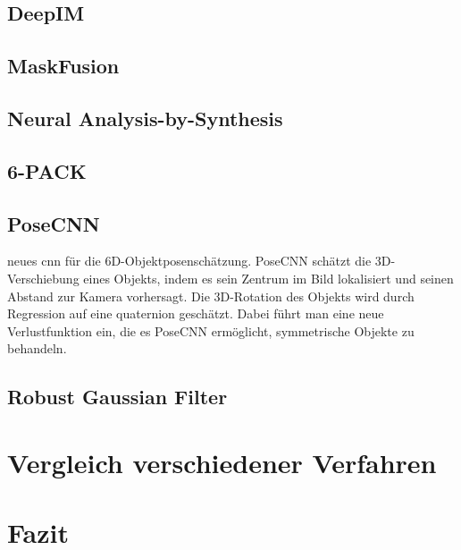 \documentclass[a4paper, 11pt]{article}
\begin{document}
\begin{multicols*}{2}
    \subsection{DeepIM\cite{Deepim}}

    \subsection{MaskFusion\cite{MaskFusion}}

    \subsection{Neural Analysis-by-Synthesis\cite{CategoryLevelObject}}

    \subsection{6-PACK\cite{6pack}}

    \subsection{PoseCNN\cite{PoseCNN}}
    neues \Gls{cnn} für die 6D-Objektposenschätzung. PoseCNN schätzt die 3D-Verschiebung eines Objekts, indem es sein Zentrum im Bild lokalisiert und seinen Abstand zur Kamera vorhersagt. Die 3D-Rotation des Objekts wird durch Regression auf eine \Gls{quaternion} geschätzt. Dabei führt man eine neue Verlustfunktion ein, die es PoseCNN ermöglicht, symmetrische Objekte zu behandeln.

    \subsection{Robust Gaussian Filter\cite{GaussianFilter}}

    \section{Vergleich verschiedener Verfahren}

    \section{Fazit}

\end{multicols*}

\medskip

\printglossary[title=Glossar]

\printbibliography[title=Literatur]
\end{document}
